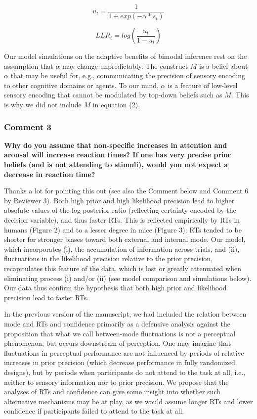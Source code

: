 \documentclass[
]{article}
\begin{document}
\begin{equation}
u_t = \frac{1}{1 + exp(-\alpha * s_t)}
\end{equation}

\begin{equation}
LLR_t = log(\frac{u_t}{1-u_t})
\end{equation}

Our model simulations on the adaptive benefits of bimodal inference rest
on the assumption that \(\alpha\) may change unpredictably. The
construct \(M\) is a belief about \(\alpha\) that may be useful for,
e.g., communicating the precision of sensory encoding to other cognitive
domains or agents. To our mind, \(\alpha\) is a feature of low-level
sensory encoding that cannot be modulated by top-down beliefs such as
\(M\). This is why we did not include \(M\) in equation (2).

\hypertarget{comment-3}{%
\subsubsection{Comment 3}\label{comment-3}}

\textbf{Why do you assume that non-specific increases in attention and
arousal will increase reaction times? If one has very precise prior
beliefs (and is not attending to stimuli), would you not expect a
decrease in reaction time?}

Thanks a lot for pointing this out (see also the Comment below and
Comment 6 by Reviewer 3). Both high prior and high likelihood precision
lead to higher absolute values of the log posterior ratio (reflecting
certainty encoded by the decision variable), and thus faster RTs. This
is reflected empirically by RTs in humans (Figure 2) and to a lesser
degree in mice (Figure 3): RTs tended to be shorter for stronger biases
toward both external and internal mode. Our model, which incorporates
(i), the accumulation of information across trials, and (ii),
fluctuations in the likelihood precision relative to the prior
precision, recapitulates this feature of the data, which is lost or
greatly attenuated when eliminating process (i) and/or (ii) (see model
comparison and simulations below). Our data thus confirm the hypothesis
that both high prior and likelihood precision lead to faster RTs.

In the previous version of the manuscript, we had included the relation
between mode and RTs and confidence primarily as a defensive analysis
against the proposition that what we call between-mode fluctuations is
not a perceptual phenomenon, but occurs downstream of perception. One
may imagine that fluctuations in perceptual performance are not
influenced by periods of relative increases in prior precision (which
decrease performance in fully randomized designs), but by periods when
participants do not attend to the task at all, i.e., neither to sensory
information nor to prior precision. We propose that the analyses of RTs
and confidence can give some insight into whether such alternative
mechanisms may be at play, as we would assume longer RTs and lower
confidence if participants failed to attend to the task at all.
\end{document}
